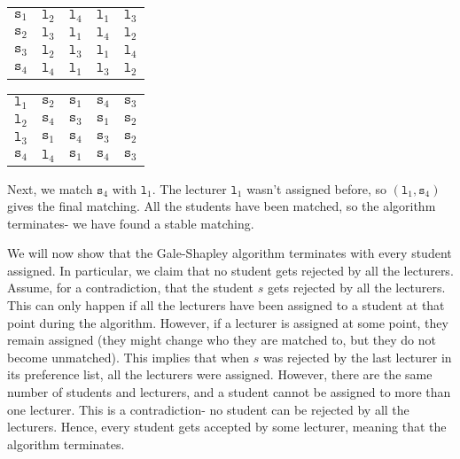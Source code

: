 \documentclass[a4paper, openany]{memoir}
\begin{document}
    \begin{table}[H]
        \centering
        \begin{subtable}{0.45\textwidth}
            \centering
            \begin{tabular}{c|cccc}
                $\texttt{s}_1$ & {\color{gray} $\texttt{l}_2$} & \underline{$\texttt{l}_4$} & $\texttt{l}_1$ & $\texttt{l}_3$ \\
                $\texttt{s}_2$ & \underline{$\texttt{l}_3$} & $\texttt{l}_1$ & $\texttt{l}_4$ & $\texttt{l}_2$ \\
                $\texttt{s}_3$ & \underline{$\texttt{l}_2$} & $\texttt{l}_3$ & $\texttt{l}_1$ & $\texttt{l}_4$ \\
                $\texttt{s}_4$ & $\texttt{l}_4$ & \underline{$\texttt{l}_1$} & $\texttt{l}_3$ & $\texttt{l}_2$
            \end{tabular}
        \end{subtable}
        \hfill
        \begin{subtable}{0.45\textwidth}
            \centering
            \begin{tabular}{c|cccc}
                $\texttt{l}_1$ & $\texttt{s}_2$ & $\texttt{s}_1$ & \underline{$\texttt{s}_4$} & $\texttt{s}_3$ \\
                $\texttt{l}_2$ & $\texttt{s}_4$ & \underline{$\texttt{s}_3$} & $\texttt{s}_1$ & $\texttt{s}_2$ \\
                $\texttt{l}_3$ & $\texttt{s}_1$ & $\texttt{s}_4$ & $\texttt{s}_3$ & \underline{$\texttt{s}_2$} \\
                $\texttt{s}_4$ & {\color{gray} $\texttt{l}_4$} & \underline{$\texttt{s}_1$} & $\texttt{s}_4$ & $\texttt{s}_3$
            \end{tabular}
        \end{subtable}
    \end{table}
    \noindent Next, we match $\texttt{s}_4$ with $\texttt{l}_1$. The lecturer $\texttt{l}_1$ wasn't assigned before, so $(\texttt{l}_1, \texttt{s}_4)$ gives the final matching. All the students have been matched, so the algorithm terminates- we have found a stable matching.

    We will now show that the Gale-Shapley algorithm terminates with every student assigned. In particular, we claim that no student gets rejected by all the lecturers. Assume, for a contradiction, that the student $s$ gets rejected by all the lecturers. This can only happen if all the lecturers have been assigned to a student at that point during the algorithm. However, if a lecturer is assigned at some point, they remain assigned (they might change who they are matched to, but they do not become unmatched). This implies that when $s$ was rejected by the last lecturer in its preference list, all the lecturers were assigned. However, there are the same number of students and lecturers, and a student cannot be assigned to more than one lecturer. This is a contradiction- no student can be rejected by all the lecturers. Hence, every student gets accepted by some lecturer, meaning that the algorithm terminates. 
    
\end{document}
